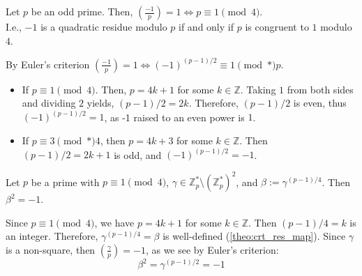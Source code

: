 \begin{theo}

    Let $p$ be an odd prime. Then, $\left(\frac{-1}{p}\right)=1\Longleftrightarrow p\equiv 1\pmod{4}$.\\
    I.e., $-1$ is a quadratic residue modulo $p$ if and only if $p$ is congruent to $1$ modulo $4$.
\end{theo}
\begin{Proof}

    \label{theo:quadratic_residue_4}
    
    By Euler's criterion $\left(\frac{-1}{p}\right)=1\Longleftrightarrow(-1)^{(p-1)/2}\equiv 1\pmod*{p}$.
    
    \begin{itemize}
        \item If $p\equiv 1\pmod{4}$. Then, $p=4k+1$ for some $k\in\mathbb{Z}$. Taking $1$ from both sides and dividing $2$ yields, $(p-1)/2=2k$.
        Therefore, $(p-1)/2$ is even, thus $(-1)^{(p-1)/2}=1$, as -1 raised to an even power is $1$.
        \item If $p\equiv 3\pmod*{4}$, then $p=4k+3$ for some $k\in\mathbb{Z}$. Then $(p-1)/2=2k+1$ is odd, and $(-1)^{(p-1)/2}=-1$.

    \end{itemize}
     
\end{Proof}

\newpage

\begin{theo}

    Let \( p \) be a prime with \( p \equiv 1 \pmod{4} \), \( \gamma \in \mathbb{Z}_p^* \setminus (\mathbb{Z}_p^*)^2 \), and \( \beta := \gamma^{(p-1)/4} \). Then \( \beta^2 = -1 \).

\end{theo}
\begin{Proof}

    Since \( p \equiv 1 \pmod{4} \), we have \( p = 4k + 1 \) for some \( k \in \mathbb{Z} \). Then \( (p-1)/4 = k \) is an integer.
    Therefore, \( \gamma^{(p-1)/4} = \beta \) is well-defined (\ref{theo:crt_res_map}). Since $\gamma$ is a non-square, then $\left(\frac{\gamma}{p}\right)=-1$, as we see by Euler's criterion:
   \Large \[ \beta^2 = \gamma^{(p-1)/2} = -1 \]
   \normalsize
\end{Proof}

